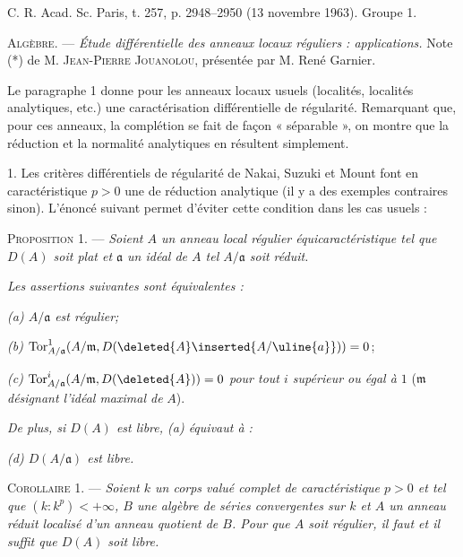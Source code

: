 C. R. Acad. Sc. Paris, t. 257, p. 2948--2950 (13 novembre 1963). \hfill Groupe 1.

\textsc{Algèbre.} --- \textit{Étude différentielle des anneaux locaux réguliers : applications.}
Note (*) de M. \textsc{Jean-Pierre Jouanolou}, présentée par M. René Garnier.

Le paragraphe 1 donne pour les anneaux locaux usuels (localités, localités analytiques, etc.) une caractérisation différentielle de régularité. Remarquant que, pour ces anneaux, la complétion se fait de façon « séparable », on montre que la réduction et la normalité analytiques en résultent simplement.

1. Les critères différentiels de régularité de Nakai, Suzuki et Mount font  en caractéristique $p>0$ une  de réduction analytique (il y a des exemples contraires sinon). L'énoncé suivant permet d'éviter cette condition dans les cas usuels :

\textsc{Proposition 1.} --- \textit{Soient $A$ un anneau local régulier équicaractéristique tel que $D(A)$ soit plat et $\mathfrak{a}$ un idéal de $A$ tel $A/\mathfrak{a}$ soit réduit.}

\textit{Les assertions suivantes sont équivalentes :}

\textit{(a) $A/\mathfrak{a}$ est régulier;}

\textit{(b)} $\operatorname{Tor}^{1}_{A/\mathfrak{a}}(A/\mathfrak{m},D(\deleted{A}\inserted{A/\uline{a}}))=0$;

\textit{(c)} $\operatorname{Tor}^{i}_{A/\mathfrak{a}}(A/\mathfrak{m},D(\deleted{A}))=0$ \textit{pour tout $i$ supérieur ou égal à $1$} ($\mathfrak{m}$ \textit{désignant l'idéal maximal de} $A$).

\textit{De plus, si $D(A)$ est libre, (a) équivaut à :}

\textit{(d) $D(A/\mathfrak{a})$ est libre.}

\textsc{Corollaire 1.} --- \textit{Soient $k$ un corps valué complet de caractéristique $p>0$ et tel que $(k:k^p)<+\infty$, $B$ une algèbre de séries convergentes sur $k$ et $A$ un anneau réduit localisé d'un anneau quotient de $B$. Pour que $A$ soit régulier, il faut et il suffit que $D(A)$ soit libre.}

